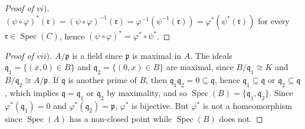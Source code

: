 \documentclass[12pt,letterpaper]{article}
\theoremstyle{definition}
\theoremstyle{remark}
\numberwithin{figure}{problem}
\numberwithin{equation}{section}
\DeclareMathOperator{\Spec}{Spec}
\begin{document}
\begin{proof}[Proof of $vi)$]
  $(\psi \circ \varphi)^*(\mathfrak{r}) = (\psi \circ \varphi)^{-1}(\mathfrak{r}) = \varphi^{-1}(\psi^{-1}(\mathfrak{r})) = \varphi^*(\psi^*(\mathfrak{r}))$ for every $\mathfrak{r} \in \Spec(C)$, hence $(\psi \circ \varphi)^* = \varphi^* \circ \psi^*$.
\end{proof}
\begin{proof}[Proof of $vii)$]
  $A/\mathfrak{p}$ is a field since $\mathfrak{p}$ is maximal in $A$. The ideals $\mathfrak{q}_1 = \{(\overline{x},0) \in B\}$ and $\mathfrak{q}_2 = \{(0,x) \in B\}$ are maximal, since $B/\mathfrak{q}_1 \cong K$ and $B/\mathfrak{q}_2 \cong A/\mathfrak{p}$. If $\mathfrak{q}$ is another prime of $B$, then $\mathfrak{q}_1\mathfrak{q}_2 = 0 \subseteq \mathfrak{q}$, hence $\mathfrak{q}_1 \subseteq \mathfrak{q}$ or $\mathfrak{q}_2 \subseteq \mathfrak{q}$, which implies $\mathfrak{q} = \mathfrak{q}_1$ or $\mathfrak{q}_2$ by maximality, and so $\Spec(B) = \{\mathfrak{q}_1,\mathfrak{q}_2\}$. Since $\varphi^*(\mathfrak{q}_1) = 0$ and $\varphi^*(\mathfrak{q}_2) = \mathfrak{p}$, $\varphi^*$ is bijective. But $\varphi^*$ is not a homeomorphism since $\Spec(A)$ has a non-closed point while $\Spec(B)$ does not. 
\end{proof}
\end{document}
